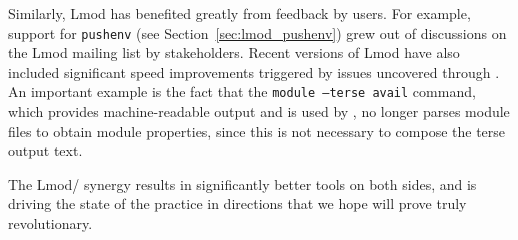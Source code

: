 Similarly, Lmod has benefited greatly from feedback by \easybuild{} users.
For example, support for \texttt{pushenv} (see
Section~\ref{sec:lmod_pushenv}) grew out of discussions on the Lmod
mailing list by \easybuild{} stakeholders. Recent versions of Lmod
have also included significant speed improvements triggered by issues
uncovered through \easybuild{}. An important example is the fact that
the \texttt{module --terse avail} command, which provides machine-readable output and
is used by \easybuild{}, no longer parses module files to obtain module properties,
since this is not necessary to compose the terse output text.

The Lmod/\easybuild{} synergy results in significantly better tools on both sides,
and is driving the state of the practice in directions that we hope will prove truly
revolutionary.
